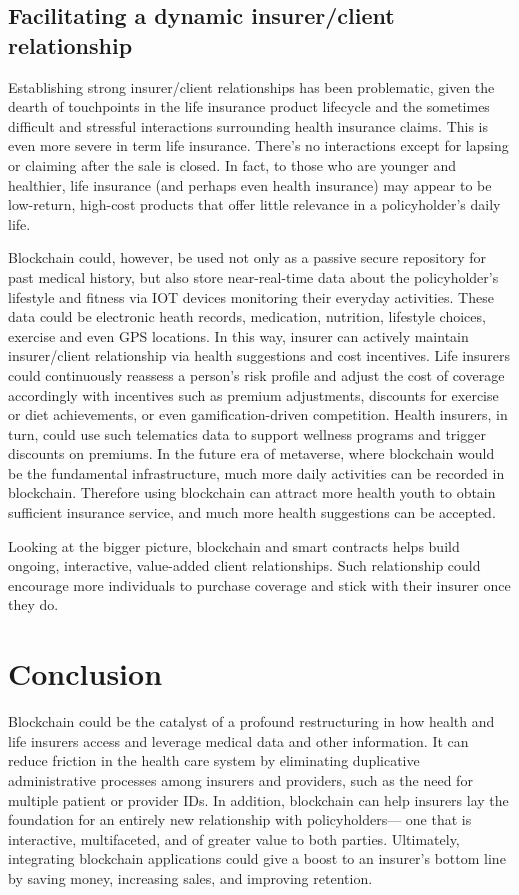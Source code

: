 \subsection{Facilitating a dynamic insurer/client relationship}

Establishing strong insurer/client relationships has been problematic,
given the dearth of touchpoints in the life insurance product lifecycle and
the sometimes difficult and stressful interactions surrounding health insurance claims.
This is even more severe in term life insurance. There's no interactions except for lapsing or claiming
after the sale is closed.
In fact, to those who are younger and healthier,
life insurance (and perhaps even health insurance) may appear to be low-return,
high-cost products that offer little relevance in a policyholder’s daily life.

Blockchain could, however, be used not only as a passive secure repository for past medical history,
but also store near-real-time data about the policyholder’s lifestyle and fitness via
IOT devices monitoring their everyday activities. These data could be electronic heath records,
medication, nutrition, lifestyle choices, exercise and even GPS locations.
In this way, insurer can actively maintain insurer/client relationship via health suggestions and cost incentives.
Life insurers could continuously reassess a person’s risk profile and
adjust the cost of coverage accordingly with incentives such as premium adjustments,
discounts for exercise or diet achievements, or even gamification-driven competition.
Health insurers, in turn, could use such telematics data to support wellness programs and
trigger discounts on premiums. In the future era of metaverse, where blockchain would be
the fundamental infrastructure, much more daily activities can be recorded in blockchain.
Therefore using blockchain can attract more health youth to obtain sufficient insurance service,
and much more health suggestions can be accepted.

Looking at the bigger picture, blockchain and smart contracts
helps build ongoing, interactive, value-added client relationships.
Such relationship could encourage more individuals to purchase coverage and
stick with their insurer once they do.

\section{Conclusion}

Blockchain could be the catalyst of a profound restructuring in how health and life insurers
access and leverage medical data and other information. It can reduce friction in the health
care system by eliminating duplicative administrative processes among insurers and providers,
such as the need for multiple patient or provider IDs. In addition, blockchain can help insurers
lay the foundation for an entirely new relationship with policyholders— one that is interactive,
multifaceted, and of greater value to both parties. Ultimately, integrating blockchain
applications could give a boost to an insurer’s bottom line by saving money, increasing sales,
and improving retention.
